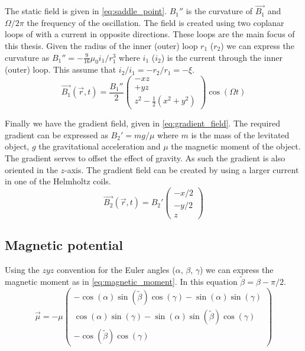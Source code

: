 The static field is given in \autoref{eq:saddle_point}. $B_1''$ is the curvature of $\vec{B_1}$ and $\Omega / 2\pi$ the frequency of the oscillation. The field is created using two coplanar loops of with a current in opposite directions. These loops are the main focus of this thesis. Given the radius of the inner (outer) loop $r_1$ ($r_2$) we can express the curvature as $B_1'' = -\frac{9}{16}\mu_0i_1/r_1^3$ where $i_1$ ($i_2$) is the current through the inner (outer) loop\cite{perdriat}. This assume that $i_2/i_1 = -r_2/r_1 = -\xi$.
\begin{equation}
    \vec{B_1}(\vec{r}, t) = \frac{B_1''}{2} \begin{pmatrix}
        -xz \\
        +yz \\
        z^2 - \frac{1}{2}\left(x^2 + y^2\right)
    \end{pmatrix} \cos(\Omega t)
    \label{eq:saddle_point}
\end{equation}

Finally we have the gradient field, given in \autoref{eq:gradient_field}. The required gradient can be expressed as $B_2' = mg/\mu$ where $m$ is the mass of the levitated object, $g$ the gravitational acceleration and $\mu$ the magnetic moment of the object. The gradient serves to offset the effect of gravity. As such the gradient is also oriented in the $z$-axis. The gradient field can be created by using a larger current in one of the Helmholtz coils.
\begin{equation}
    \vec{B_2}(\vec{r}, t) = B_2' \begin{pmatrix}
        -x / 2 \\
        -y / 2 \\
        z
    \end{pmatrix}
    \label{eq:gradient_field}
\end{equation}

\subsection{Magnetic potential}
\label{subsec:magnetic_moment}
Using the $zyz$ convention for the Euler angles ($\alpha$, $\beta$, $\gamma$) we can express the magnetic moment as in \autoref{eq:magnetic_moment}\cite{perdriat}. In this equation $\tilde\beta = \beta - \pi/2$.
\begin{equation}
    \vec{\mu} = -\mu \begin{pmatrix}
        -\cos(\alpha)\sin(\tilde\beta)\cos(\gamma) - \sin(\alpha)\sin(\gamma) \\
        \cos(\alpha)\sin(\gamma) - \sin(\alpha)\sin(\tilde\beta)\cos(\gamma) \\
        -\cos(\tilde\beta)\cos(\gamma)
    \end{pmatrix}
    \label{eq:magnetic_moment}
\end{equation}


